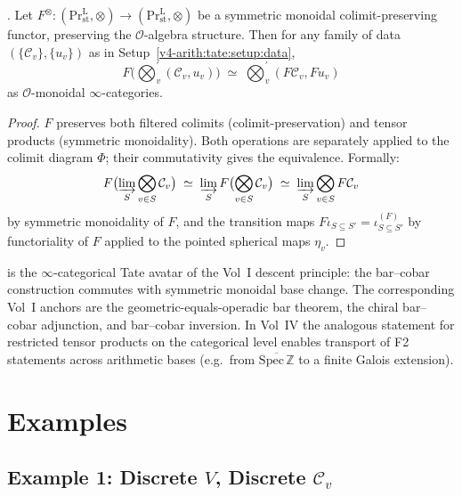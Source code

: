 \begin{proposition}
\label{v4-arith:tate:prop:base-change}
\ClaimStatusProvedHere. Let
\(F^{\otimes}:(\mathrm{Pr}^{\mathrm{L}}_{\mathrm{st}},\otimes)\to(\mathrm{Pr}^{\mathrm{L}}_{\mathrm{st}},\otimes)\)
be a symmetric monoidal colimit-preserving functor, preserving
the \(\mathcal{O}\)-algebra structure. Then for any family of data
\((\{\mathcal{C}_{v}\},\{u_{v}\})\) as in
Setup~\ref{v4-arith:tate:setup:data},
\[
F\bigl(\bigotimes_{v}^{\prime}(\mathcal{C}_{v},u_{v})\bigr)\;\simeq\;\bigotimes_{v}^{\prime}(F\mathcal{C}_{v},F u_{v})
\]
as \(\mathcal{O}\)-monoidal \(\infty\)-categories.
\end{proposition}

\begin{proof}
\(F\) preserves both filtered colimits (colimit-preservation) and
tensor products (symmetric monoidality). Both operations are
separately applied to the colimit diagram \(\Phi\); their
commutativity gives the equivalence. Formally:
\[
F\bigl(\varinjlim_{S}\bigotimes_{v\in S}\mathcal{C}_{v}\bigr)\;\simeq\;\varinjlim_{S}F\bigl(\bigotimes_{v\in S}\mathcal{C}_{v}\bigr)\;\simeq\;\varinjlim_{S}\bigotimes_{v\in S}F\mathcal{C}_{v}
\]
by symmetric monoidality of \(F\), and the transition maps
\(F\iota_{S\subseteq S'}=\iota^{(F)}_{S\subseteq S'}\) by functoriality
of \(F\) applied to the pointed spherical maps \(\eta_{v}\).
\end{proof}

\begin{remark}
\label{v4-arith:tate:rem:vol-I-coherence}
 is the \(\infty\)-categorical
Tate avatar of the Vol~I descent principle: the bar--cobar
construction commutes with symmetric monoidal base change. The
corresponding Vol~I anchors are the geometric-equals-operadic bar
theorem, the chiral bar--cobar adjunction, and bar--cobar inversion.
In Vol~IV
the analogous statement for restricted tensor products on the
categorical level enables transport of F2 statements across
arithmetic bases (e.g.~from \(\overline{\mathrm{Spec}\,\mathbb{Z}}\)
to a finite Galois extension).
\end{remark}

\section{Examples}
\label{v4-arith:tate:examples}

\subsection{Example 1: Discrete \(V\), Discrete \(\mathcal{C}_{v}\)}

